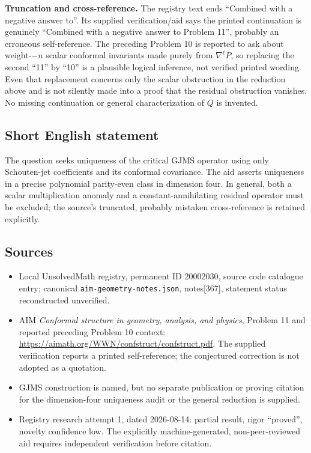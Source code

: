 \documentclass[11pt]{article}
\begin{document}
\textbf{Truncation and cross-reference.} The registry text ends ``Combined with a negative answer to''. Its supplied verification/aid says the printed continuation is genuinely ``Combined with a negative answer to Problem 11'', probably an erroneous self-reference. The preceding Problem 10 is reported to ask about weight-$-n$ scalar conformal invariants made purely from $\nabla^\ell P$, so replacing the second ``11'' by ``10'' is a plausible logical inference, not verified printed wording. Even that replacement concerns only the scalar obstruction in the reduction above and is not silently made into a proof that the residual obstruction vanishes. No missing continuation or general characterization of $Q$ is invented.
\subsection{Short English statement}
The question seeks uniqueness of the critical GJMS operator using only Schouten-jet coefficients and its conformal covariance. The aid asserts uniqueness in a precise polynomial parity-even class in dimension four. In general, both a scalar multiplication anomaly and a constant-annihilating residual operator must be excluded; the source's truncated, probably mistaken cross-reference is retained explicitly.
\subsection{Sources}
\begin{itemize}
\item Local UnsolvedMath registry, permanent ID 20002030, source code catalogue entry; canonical \texttt{aim-geometry-notes.json}, notes[367], statement status reconstructed unverified.
\item AIM \emph{Conformal structure in geometry, analysis, and physics}, Problem 11 and reported preceding Problem 10 context: \url{https://aimath.org/WWN/confstruct/confstruct.pdf}. The supplied verification reports a printed self-reference; the conjectured correction is not adopted as a quotation.
\item GJMS construction is named, but no separate publication or proving citation for the dimension-four uniqueness audit or the general reduction is supplied.
\item Registry research attempt 1, dated 2026-08-14: partial result, rigor ``proved'', novelty confidence low. The explicitly machine-generated, non-peer-reviewed aid requires independent verification before citation.
\end{itemize}
\end{document}
